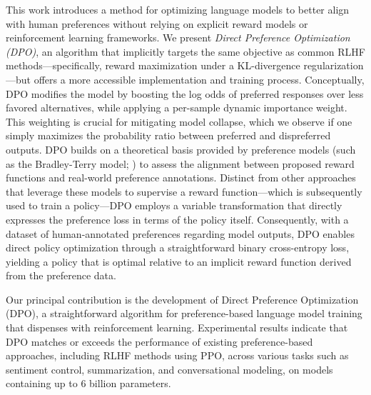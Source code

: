 This work introduces a method for optimizing language models to better align with human preferences without relying on explicit reward models or reinforcement learning frameworks. We present \textit{{Direct Preference Optimization} (DPO)}, an algorithm that implicitly targets the same objective as common RLHF methods—specifically, reward maximization under a KL-divergence regularization—but offers a more accessible implementation and training process. Conceptually, DPO modifies the model by boosting the log odds of preferred responses over less favored alternatives, while applying a per-sample dynamic importance weight. This weighting is crucial for mitigating model collapse, which we observe if one simply maximizes the probability ratio between preferred and dispreferred outputs. DPO builds on a theoretical basis provided by preference models (such as the Bradley-Terry model; \cite{bradley1952rankanalysis}) to assess the alignment between proposed reward functions and real-world preference annotations. Distinct from other approaches that leverage these models to supervise a reward function—which is subsequently used to train a policy—DPO employs a variable transformation that directly expresses the preference loss in terms of the policy itself. Consequently, with a dataset of human-annotated preferences regarding model outputs, DPO enables direct policy optimization through a straightforward binary cross-entropy loss, yielding a policy that is optimal relative to an implicit reward function derived from the preference data.

Our principal contribution is the development of Direct Preference Optimization (DPO), a straightforward algorithm for preference-based language model training that dispenses with reinforcement learning. Experimental results indicate that DPO matches or exceeds the performance of existing preference-based approaches, including RLHF methods using PPO, across various tasks such as sentiment control, summarization, and conversational modeling, on models containing up to 6 billion parameters.


